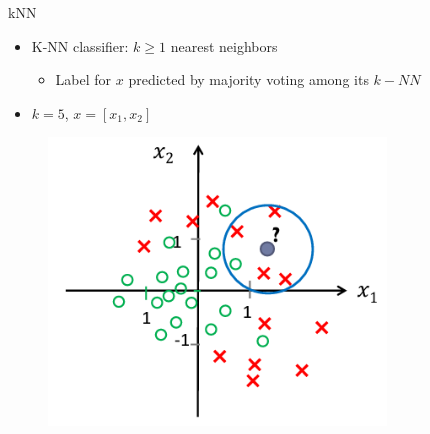\documentclass[serif, aspectratio=169]{beamer}
\begin{document}
\begin{frame}{kNN}
    \begin{minipage}{0.5\textwidth}
        \begin{itemize}
            \item K-NN classifier: $k \geq 1$ nearest neighbors
            \begin{itemize}
                \item Label for $x$ predicted by majority voting among its $k-NN$
            \end{itemize}
            \item $k=5$, $x=[x_1, x_2]$
        \end{itemize}
    \end{minipage} %
    \begin{minipage}{0.45\textwidth}
        \begin{figure}[h]
        \centering
        \includegraphics[width=0.8\textwidth]{pic/kE5.png}
        \end{figure}
        
        \vfill
    \end{minipage}
    
    
\end{frame}
\end{document}
